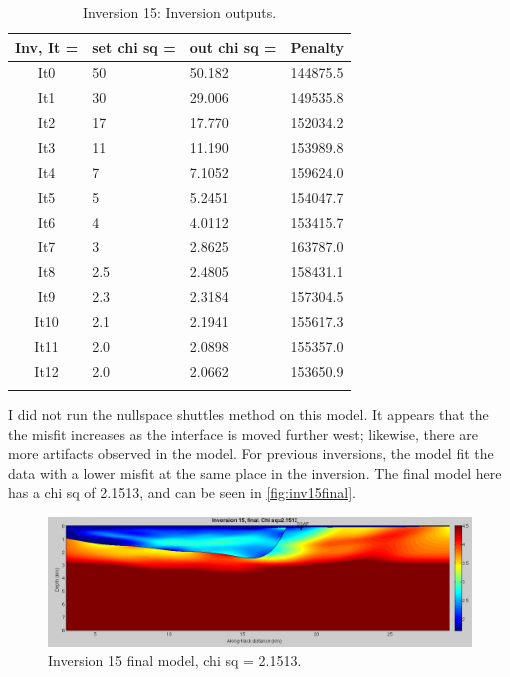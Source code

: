 \documentclass[fontsize=11pt, %
                             paper=a4, %
                             twoside, %
                             captions=tableheading,
                             index=totoc,
                             hyperref]{labbook}
\begin{document}
\begin{addmargin}[4cm]{0cm}
\begin{table}[!ht]
\label{tab:i15}
\raggedleft
\begin{tabular}{c l l l}
\toprule
\textbf{Inv, It = } & \textbf{set chi sq =} & \textbf{out chi sq =} & \textbf{Penalty} \\
\toprule
It0 & 50 & 50.182 & 144875.5\\
It1 & 30 & 29.006 & 149535.8\\
It2 & 17 & 17.770 & 152034.2\\
It3 & 11 & 11.190 & 153989.8\\
It4 & 7 & 7.1052 & 159624.0\\
It5 & 5 & 5.2451 & 154047.7\\
It6 & 4 & 4.0112 & 153415.7\\
It7 & 3 & 2.8625 & 163787.0\\
It8 & 2.5 & 2.4805 & 158431.1\\
It9 & 2.3 & 2.3184 & 157304.5\\
It10 & 2.1 & 2.1941 & 155617.3\\
It11 & 2.0 & 2.0898 & 155357.0\\
It12 & 2.0 & 2.0662 & 153650.9\\
\bottomrule\\
\end{tabular}
\caption{Inversion 15: Inversion outputs.}
\end{table}

I did not run the nullspace shuttles method on this model.  It appears that the the misfit increases as the interface is moved further west; likewise, there are more artifacts observed in the model.  For previous inversions, the model fit the data with a lower misfit at the same place in the inversion.  The final model here has a chi sq of 2.1513, and can be seen in \autoref{fig:inv15final}.

\begin{figure}[h!]
\raggedleft
\includegraphics[scale=0.35,keepaspectratio=true]{figs/Inv15_final.png}
\caption{Inversion 15 final model, chi sq = 2.1513.}
\label{fig:inv15final}
\end{figure}



\end{addmargin}
\end{document}
